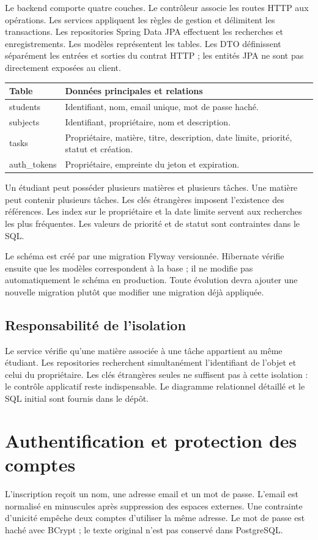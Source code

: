 \documentclass[11pt,a4paper]{article}
\begin{document}
Le backend comporte quatre couches. Le contrôleur associe les routes HTTP aux opérations. Les services appliquent les règles de gestion et délimitent les transactions. Les repositories Spring Data JPA effectuent les recherches et enregistrements. Les modèles représentent les tables. Les DTO définissent séparément les entrées et sorties du contrat HTTP ; les entités JPA ne sont pas directement exposées au client.

\begin{center}
\begin{tabular}{p{3cm}p{10cm}}
\toprule
Table & Données principales et relations\\\midrule
students & Identifiant, nom, email unique, mot de passe haché.\\
subjects & Identifiant, propriétaire, nom et description.\\
tasks & Propriétaire, matière, titre, description, date limite, priorité, statut et création.\\
auth\_tokens & Propriétaire, empreinte du jeton et expiration.\\\bottomrule
\end{tabular}
\end{center}

Un étudiant peut posséder plusieurs matières et plusieurs tâches. Une matière peut contenir plusieurs tâches. Les clés étrangères imposent l'existence des références. Les index sur le propriétaire et la date limite servent aux recherches les plus fréquentes. Les valeurs de priorité et de statut sont contraintes dans le SQL.

Le schéma est créé par une migration Flyway versionnée. Hibernate vérifie ensuite que les modèles correspondent à la base ; il ne modifie pas automatiquement le schéma en production. Toute évolution devra ajouter une nouvelle migration plutôt que modifier une migration déjà appliquée.

\subsection*{Responsabilité de l'isolation}
Le service vérifie qu'une matière associée à une tâche appartient au même étudiant. Les repositories recherchent simultanément l'identifiant de l'objet et celui du propriétaire. Les clés étrangères seules ne suffisent pas à cette isolation : le contrôle applicatif reste indispensable. Le diagramme relationnel détaillé et le SQL initial sont fournis dans le dépôt.
\newpage
\section{Authentification et protection des comptes}
L'inscription reçoit un nom, une adresse email et un mot de passe. L'email est normalisé en minuscules après suppression des espaces externes. Une contrainte d'unicité empêche deux comptes d'utiliser la même adresse. Le mot de passe est haché avec BCrypt ; le texte original n'est pas conservé dans PostgreSQL.
\end{document}
